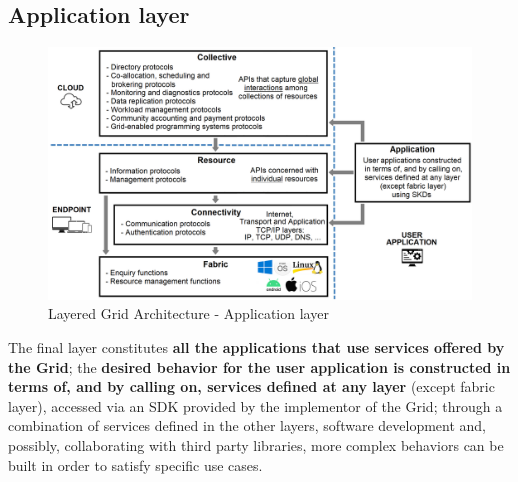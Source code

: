 \subsection{Application layer}
\begin{figure}[!ht]
    \centering
    \includegraphics[width=\linewidth]{document/chapters/chapter_2/images/application_layer.png}
    \caption{Layered Grid Architecture - Application layer}
    \label{fig:application_layer}
\end{figure}

\noindent The final layer constitutes \textbf{all the applications that use services offered by the Grid}; the \textbf{desired behavior for the user application is constructed in terms of, and by calling on, services defined at any layer} (except fabric layer), accessed via an SDK provided by the implementor of the Grid; through a combination of services defined in the other layers, software development and, possibly, collaborating with third party libraries, more complex behaviors can be built in order to satisfy specific use cases.
